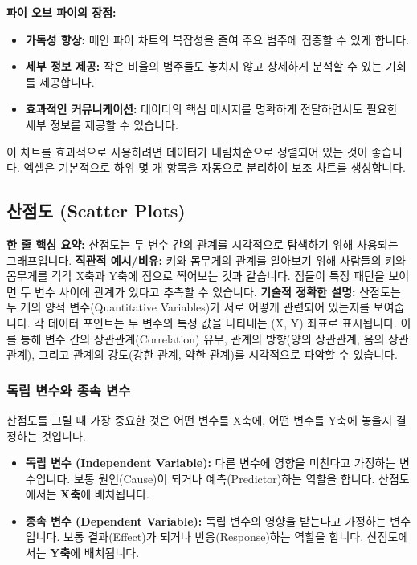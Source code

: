 \documentclass[11pt,a4paper]{article}
\theoremstyle{definition}
\begin{document}
\textbf{파이 오브 파이의 장점:}
\begin{itemize}
    \item \textbf{가독성 향상:} 메인 파이 차트의 복잡성을 줄여 주요 범주에 집중할 수 있게 합니다.
    \item \textbf{세부 정보 제공:} 작은 비율의 범주들도 놓치지 않고 상세하게 분석할 수 있는 기회를 제공합니다.
    \item \textbf{효과적인 커뮤니케이션:} 데이터의 핵심 메시지를 명확하게 전달하면서도 필요한 세부 정보를 제공할 수 있습니다.
\end{itemize}
이 차트를 효과적으로 사용하려면 데이터가 내림차순으로 정렬되어 있는 것이 좋습니다. 엑셀은 기본적으로 하위 몇 개 항목을 자동으로 분리하여 보조 차트를 생성합니다.

\newpage
\subsection{산점도 (Scatter Plots)}

\begin{conceptbox}
\textbf{한 줄 핵심 요약:} 산점도는 두 변수 간의 관계를 시각적으로 탐색하기 위해 사용되는 그래프입니다.
\textbf{직관적 예시/비유:} 키와 몸무게의 관계를 알아보기 위해 사람들의 키와 몸무게를 각각 X축과 Y축에 점으로 찍어보는 것과 같습니다. 점들이 특정 패턴을 보이면 두 변수 사이에 관계가 있다고 추측할 수 있습니다.
\textbf{기술적 정확한 설명:} 산점도는 두 개의 양적 변수(Quantitative Variables)가 서로 어떻게 관련되어 있는지를 보여줍니다. 각 데이터 포인트는 두 변수의 특정 값을 나타내는 (X, Y) 좌표로 표시됩니다. 이를 통해 변수 간의 상관관계(Correlation) 유무, 관계의 방향(양의 상관관계, 음의 상관관계), 그리고 관계의 강도(강한 관계, 약한 관계)를 시각적으로 파악할 수 있습니다.
\end{conceptbox}

\subsubsection{독립 변수와 종속 변수}
산점도를 그릴 때 가장 중요한 것은 어떤 변수를 X축에, 어떤 변수를 Y축에 놓을지 결정하는 것입니다.
\begin{itemize}
    \item \textbf{독립 변수 (Independent Variable):} 다른 변수에 영향을 미친다고 가정하는 변수입니다. 보통 원인(Cause)이 되거나 예측(Predictor)하는 역할을 합니다. 산점도에서는 \textbf{X축}에 배치됩니다.
    \item \textbf{종속 변수 (Dependent Variable):} 독립 변수의 영향을 받는다고 가정하는 변수입니다. 보통 결과(Effect)가 되거나 반응(Response)하는 역할을 합니다. 산점도에서는 \textbf{Y축}에 배치됩니다.
\end{itemize}
\end{document}
